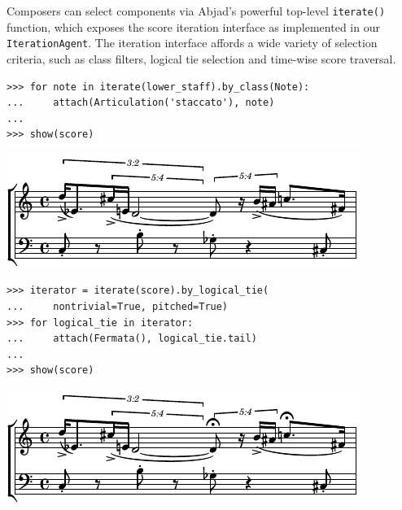\documentclass{article}
\begin{document}
Composers can select components via Abjad's powerful top-level
\texttt{iterate()} function, which exposes the score iteration interface as
implemented in our \texttt{IterationAgent}. The iteration interface affords a
wide variety of selection criteria, such as class filters, logical tie
selection and time-wise score traversal.

\begin{lstlisting}
>>> for note in iterate(lower_staff).by_class(Note):
...     attach(Articulation('staccato'), note)
...
>>> show(score)
\end{lstlisting}
\includegraphics{assets/lilypond-fa4c8d9019fcef2563aed3d7dc4eda70.pdf}

\begin{lstlisting}
>>> iterator = iterate(score).by_logical_tie(
...     nontrivial=True, pitched=True)
>>> for logical_tie in iterator:
...     attach(Fermata(), logical_tie.tail)
...
>>> show(score)
\end{lstlisting}
\includegraphics{assets/lilypond-daae1fa8ba1e5fe23f35c69be7e07f93.pdf}
\end{document}
